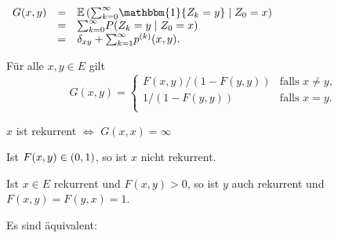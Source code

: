 \documentclass{cheat-sheet}
\newcommand{\E}{\mathbb{E}} %
\newcommand{\ind}{\mathbbm{1}} %
\begin{document}
\begin{bem}
  $
    \begin{array}[t]{r c l}
      G(x, y) &=& \E \left( {\sum}_{k=0}^\infty \ind \{ Z_k = y \} \mid Z_0 = x \right) \\
      &=& {\sum}_{k=0}^\infty P(Z_k = y \mid Z_0 = x) \\
      &=& \delta_{xy} + {\sum}_{k=1}^\infty p^{(k)}(x, y).
    \end{array}
  $
\end{bem}

\begin{satz}
  Für alle $x, y \in E$ gilt
  \[
    G(x, y) =
    \begin{cases}
      F(x, y)/(1 - F(y, y)) & \text{falls $x \neq y$}, \\
      1/(1 - F(y, y)) & \text{falls $x = y$}. \\
    \end{cases}
  \]
\end{satz}

\begin{kor}
  $x$ ist rekurrent $\iff$ $G(x, x) = \infty$
\end{kor}

\begin{lem}
  Ist $F(x, y) \in \left( 0, 1 \right)$, so ist $x$ nicht rekurrent.
\end{lem}

\begin{satz}
  Ist $x \in E$ rekurrent und $F(x, y) > 0$, so ist $y$ auch rekurrent und $F(x, y) = F(y, x) = 1$.
\end{satz}

\begin{satz}
  Es sind äquivalent:
  \begin{itemize}
  \end{itemize}
\end{satz}

\iffalse
\begin{interp}
  $F(x, y) > 0$ bedeutet, dass nach jedem Besuch in~$x$ der Zustand $y$ auch besucht wird mit positiver Wahrscheinlichkeit und die Rekurrenz von~$x$ bedeutet, dass $x$ unendlich oft besucht wird.
  Der Satz sagt, dass dann auch $y$ unendlich oft besucht wird.
\end{interp}
\fi
\end{document}

